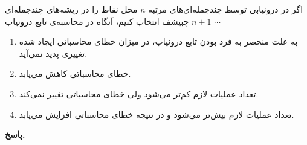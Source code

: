 اگر در درونیابی توسط چندجمله‌ای‌های مرتبه 
\(n\)
محل نقاط را در ریشه‌های چندجمله‌ای 
\(n+1\)
چبیشف انتخاب کنیم، آنگاه در محاسبه‌ی تابع درونیاب 
\(\cdots\)
\vspace*{-.3cm}
 \begin{enumerate}
	\item به علت منحصر به فرد بودن تابع درونیاب، در میزان خطای محاسباتی ایجاد شده تغییری پدید نمی‌آید.
	\item خطای محاسباتی کاهش می‌یابد.
	\item تعداد عملیات لازم کم‌تر می‌شود ولی خطای محاسباتی تغییر نمی‌کند.
	\item تعداد عملیات لازم بیش‌تر می‌شود و در نتیجه خطای محاسباتی افزایش می‌یابد.
\end{enumerate}

\begin{answer}

	\textbf{پاسخ.}
	
\end{answer}
